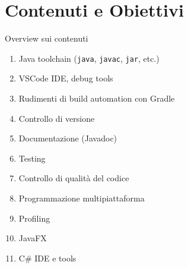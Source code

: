 \documentclass[xcolor=dvipsnames,presentation]{beamer}
\begin{document}


\section{Contenuti e Obiettivi}

\begin{frame}{Overview sui contenuti}

\begin{enumerate}
    \item Java toolchain (\texttt{java}, \texttt{javac}, \texttt{jar}, etc.)
    \item VSCode IDE, debug tools
    \item Rudimenti di build automation con Gradle
    \item Controllo di versione
    \item Documentazione (Javadoc)
    \item Testing
    \item Controllo di qualità del codice
    \item Programmazione multipiattaforma
    \item Profiling
    \item JavaFX
    \item C\# IDE e tools
\end{enumerate}

\end{frame}
\end{document}
